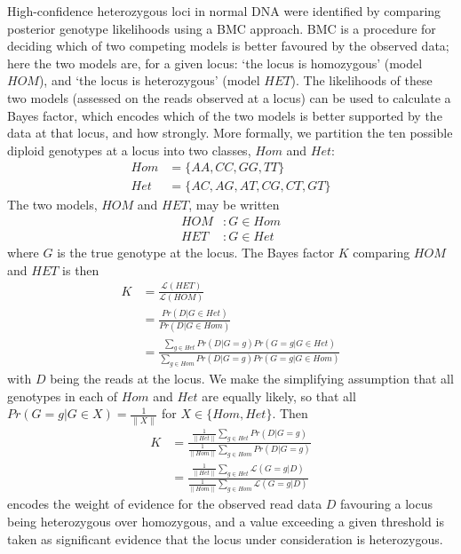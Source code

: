 \documentclass[dissertation.tex]{subfiles}
\begin{document}
High-confidence heterozygous loci in normal DNA were identified by comparing posterior genotype likelihoods using a \gls{BMC} approach.  \gls{BMC} is a procedure for deciding which of two competing models is better favoured by the observed data; here the two models are, for a given locus: `the locus is homozygous' (model $HOM$), and `the locus is heterozygous' (model $HET$).  The likelihoods of these two models (assessed on the reads observed at a locus) can be used to calculate a Bayes factor, which encodes which of the two models is better supported by the data at that locus, and how strongly.  More formally, we partition the ten possible diploid genotypes at a locus into two classes, $Hom$ and $Het$:
\begin{align}
Hom &= \{AA, CC, GG, TT\} \\
Het &= \{AC, AG, AT, CG, CT, GT\}
\end{align}
The two models, $HOM$ and $HET$, may be written
\begin{align}
HOM &: G \in Hom \\
HET &: G \in Het
\end{align}
where $G$ is the true genotype at the locus.  The Bayes factor $K$ comparing $HOM$ and $HET$ is then
\begin{align}
K &= \frac{\mathcal{L}(HET)}{\mathcal{L}(HOM)} \\
  &= \frac{Pr(D|G \in Het)}{Pr(D|G \in Hom)} \\
  &= \frac{\sum_{g \in Het} Pr(D|G = g)Pr(G = g|G \in Het) }{\sum_{g \in Hom} Pr(D|G = g)Pr(G = g|G \in Hom) }
\label{eq:comm_het_bayes}
\end{align}
with $D$ being the reads at the locus.  We make the simplifying assumption that all genotypes in each of $Hom$ and $Het$ are equally likely, so that all $Pr(G = g|G \in X) = \frac{1}{\|X\|}$ for $X \in \{Hom, Het\}$.  Then
\begin{align}
K &= \frac{\frac{1}{\|Het\|}\sum_{g \in Het} Pr(D|G = g)}{\frac{1}{\|Hom\|}\sum_{g \in Hom} Pr(D|G = g)} \\
  &= \frac{\frac{1}{\|Het\|}\sum_{g \in Het} \mathcal{L}(G = g|D)}{\frac{1}{\|Hom\|}\sum_{g \in Hom} \mathcal{L}(G = g|D)}
\end{align} 
encodes the weight of evidence for the observed read data $D$ favouring a locus being heterozygous over homozygous, and a value exceeding a given threshold is taken as significant evidence that the locus under consideration is heterozygous.
\end{document}
